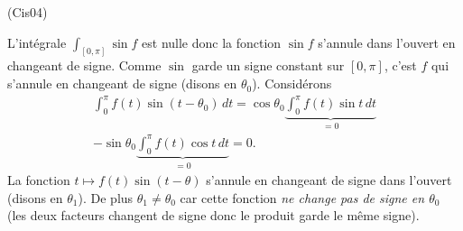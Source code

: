 \begin{tiny}(Cis04)\end{tiny} L'intégrale $\int_{\left[ 0,\pi\right] } \sin f$ est nulle donc la fonction $\sin f$ s'annule dans l'ouvert en changeant de signe. Comme $\sin$ garde un signe constant sur $\left[ 0, \pi\right]$, c'est $f$ qui s'annule en changeant de signe (disons en $\theta_0$).\newline
Considérons 
\begin{multline*}
 \int_0^\pi
f(t) \sin(t-\theta_0)\,dt = 
\cos \theta_0 \underset{= 0}{\underbrace{\int_0^\pi f(t)\sin t\, dt}} \\
- \sin \theta_0  \underset{= 0 }{\underbrace{\int_0^\pi f(t)\cos t\, dt}}
= 0.
\end{multline*}
La fonction $t\mapsto f(t) \sin(t-\theta)$ s'annule en changeant de signe dans l'ouvert (disons en $\theta_1$). De plus $\theta_1 \neq \theta_0$ car cette fonction \emph{ne change pas de signe en $\theta_0$} (les deux facteurs changent de signe donc le produit garde le même signe). 